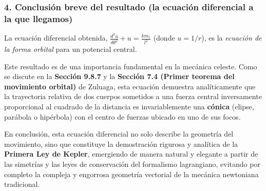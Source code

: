 \documentclass[a4paper]{article}
\begin{document}
\subsubsection*{4. Conclusión breve del resultado (la ecuación diferencial a la que llegamos)}
La ecuación diferencial obtenida, $\frac{d^2u}{d\theta^2} + u = \frac{km_r}{l^2}$ (donde $u = 1/r$), es la \textit{ecuación de la forma orbital} para un potencial central. 

Este resultado es de una importancia fundamental en la mecánica celeste. Como se discute en la \textbf{Sección 9.8.7} y la \textbf{Sección 7.4 (Primer teorema del movimiento orbital)} de Zuluaga, esta ecuación demuestra analíticamente que la trayectoria relativa de dos cuerpos sometidos a una fuerza central inversamente proporcional al cuadrado de la distancia es invariablemente una \textbf{cónica} (elipse, parábola o hipérbola) con el centro de fuerzas ubicado en uno de sus focos. 

En conclusión, esta ecuación diferencial no solo describe la geometría del movimiento, sino que constituye la demostración rigurosa y analítica de la \textbf{Primera Ley de Kepler}, emergiendo de manera natural y elegante a partir de las simetrías y las leyes de conservación del formalismo lagrangiano, evitando por completo la compleja y engorrosa geometría vectorial de la mecánica newtoniana tradicional.


 
\end{document}
